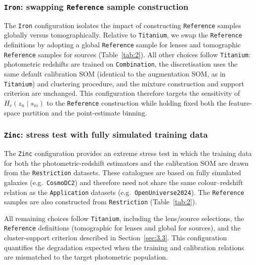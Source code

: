 \subsubsection{\texttt{Iron}: swapping \texttt{Reference} sample construction} \label{sec:3.4.5}

The \texttt{Iron} configuration isolates the impact of constructing \texttt{Reference} samples globally versus tomographically. Relative to \texttt{Titanium}, we swap the \texttt{Reference} definitions by adopting a global \texttt{Reference} sample for lenses and tomographic \texttt{Reference} samples for sources (Table~\ref{tab:2}). All other choices follow \texttt{Titanium}: photometric redshifts are trained on \texttt{Combination}, the discretisation uses the same default calibration SOM (identical to the augmentation SOM, as in \texttt{Titanium}) and clustering procedure, and the mixture construction and support criterion are unchanged. This configuration therefore targets the sensitivity of \(H_c(z_n\mid s_m)\) to the \texttt{Reference} construction while holding fixed both the feature-space partition and the point-estimate binning.

\subsubsection{\texttt{Zinc}: stress test with fully simulated training data} \label{sec:3.4.6}

The \texttt{Zinc} configuration provides an extreme stress test in which the training data for both the photometric-redshift estimators and the calibration SOM are drawn from the \texttt{Restriction} datasets. These catalogues are based on fully simulated galaxies (e.g.\ \texttt{CosmoDC2}) and therefore need not share the same colour--redshift relation as the \texttt{Application} datasets (e.g.\ \texttt{OpenUniverse2024}). The \texttt{Reference} samples are also constructed from \texttt{Restriction} (Table~\ref{tab:2}).

All remaining choices follow \texttt{Titanium}, including the lens/source selections, the \texttt{Reference} definitions (tomographic for lenses and global for sources), and the cluster-support criterion described in Section~\ref{sec:3.3}. This configuration quantifies the degradation expected when the training and calibration relations are mismatched to the target photometric population.